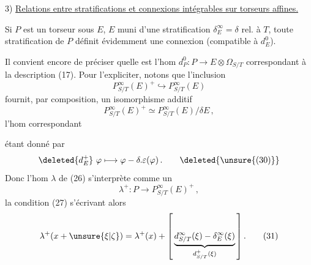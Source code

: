 3) \uline{Relations entre stratifications et connexions intégrables sur torseurs affines.}

Si $P$ est un torseur sous $E$, $E$ muni d'une stratification $\delta^\infty_E=\delta$ rel. à $T$, toute stratification de $P$  définit évidemment une connexion (compatible à $d^0_E$).


Il convient encore de préciser quelle est l'hom $d^0_P:P\longrightarrow E\otimes\Omega_{S/T}$ correspondant à la description (17). Pour l'expliciter, notons que l'inclusion
\[
 P^\infty_{S/T}(E)^+\hookrightarrow P^\infty_{S/T}(E)
\]
fournit, par composition, un isomorphisme additif
\[
 P^\infty_{S/T}(E)^+\simeq P^\infty_{S/T}(E)/\delta E \,, \tag*{(29)}
\]
\margin{Définir les sections \deleted{\unsure{hom|hor}} \uline{intégrables} de $P^\infty_{S/T}(E)^+$ comme celles correspondant aux \deleted{\unsure{éléments}} \inserted{sections} de $\bigl(P^\infty_{S/T}(E)/\delta E\bigr)^\natural$, et introduire la notation $P^\infty_{S/T}(E)^+$ [Mais Attention, $P^\infty_{S/T}(E)^+\hookrightarrow P^\infty_{S/T}(E)$ \uline{n'est pas} compatible avec stratifications}
l'hom correspondant


étant donné par
\[
 \deleted{d^+_E}\ \varphi\longmapsto\varphi-\delta.\varepsilon(\varphi)\,. \tag*{\deleted{\unsure{(30)}}}
\]
Donc l'hom $\lambda$ de (26) s'interprète comme un
\[
 \lambda^+:P\longrightarrow P^\infty_{S/T}(E)^+ \,, \tag*{(30)}
\]
 la condition (27) s'écrivant alors
\[
 \lambda^+(x+\unsure{\xi|\zeta})=\lambda^+(x)+\left[\,\underbrace{d^\infty_{S/T}(\xi)-\delta^\infty_E(\xi)}_{d^+_{S/T}(\xi)}\,\right]. \tag*{(31)}
\]
